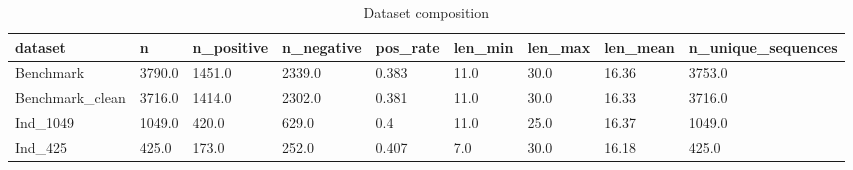 \begin{table}[ht]
\centering\small
\caption{Dataset composition}
\label{tab:T3_1_dataset_composition}
\begin{tabular}{lllllllll}
\hline
dataset & n & n\_positive & n\_negative & pos\_rate & len\_min & len\_max & len\_mean & n\_unique\_sequences \\
\hline
Benchmark & 3790.0 & 1451.0 & 2339.0 & 0.383 & 11.0 & 30.0 & 16.36 & 3753.0 \\
Benchmark\_clean & 3716.0 & 1414.0 & 2302.0 & 0.381 & 11.0 & 30.0 & 16.33 & 3716.0 \\
Ind\_1049 & 1049.0 & 420.0 & 629.0 & 0.4 & 11.0 & 25.0 & 16.37 & 1049.0 \\
Ind\_425 & 425.0 & 173.0 & 252.0 & 0.407 & 7.0 & 30.0 & 16.18 & 425.0 \\
\hline
\end{tabular}
\end{table}
